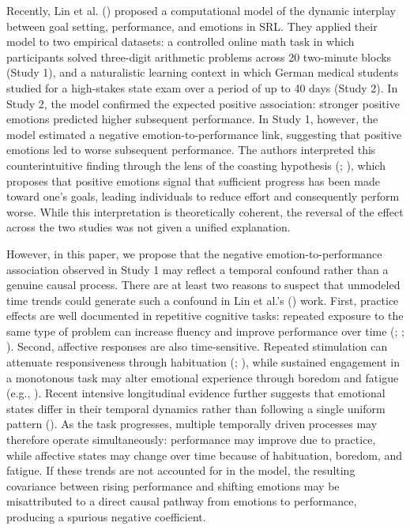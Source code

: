 \documentclass[
  man,
  floatsintext,
  longtable,
  nolmodern,
  notxfonts,
  notimes,
  colorlinks=true,linkcolor=blue,citecolor=blue,urlcolor=blue]{apa7}
\begin{document}
Recently, Lin et al. () proposed a
computational model of the dynamic interplay between goal setting,
performance, and emotions in SRL. They applied their model to two
empirical datasets: a controlled online math task in which participants
solved three-digit arithmetic problems across 20 two-minute blocks
(Study 1), and a naturalistic learning context in which German medical
students studied for a high-stakes state exam over a period of up to 40
days (Study 2). In Study 2, the model confirmed the expected positive
association: stronger positive emotions predicted higher subsequent
performance. In Study 1, however, the model estimated a negative
emotion-to-performance link, suggesting that positive emotions led to
worse subsequent performance. The authors interpreted this
counterintuitive finding through the lens of the coasting hypothesis
(;
), which proposes
that positive emotions signal that sufficient progress has been made
toward one's goals, leading individuals to reduce effort and
consequently perform worse. While this interpretation is theoretically
coherent, the reversal of the effect across the two studies was not
given a unified explanation.

However, in this paper, we propose that the negative
emotion-to-performance association observed in Study 1 may reflect a
temporal confound rather than a genuine causal process. There are at
least two reasons to suspect that unmodeled time trends could generate
such a confound in Lin et al.'s ()
work. First, practice effects are well documented in repetitive
cognitive tasks: repeated exposure to the same type of problem can
increase fluency and improve performance over time
(;
;
). Second,
affective responses are also time-sensitive. Repeated stimulation can
attenuate responsiveness through habituation
(;
), while
sustained engagement in a monotonous task may alter emotional experience
through boredom and fatigue (e.g.,
). Recent
intensive longitudinal evidence further suggests that emotional states
differ in their temporal dynamics rather than following a single uniform
pattern (). As
the task progresses, multiple temporally driven processes may therefore
operate simultaneously: performance may improve due to practice, while
affective states may change over time because of habituation, boredom,
and fatigue. If these trends are not accounted for in the model, the
resulting covariance between rising performance and shifting emotions
may be misattributed to a direct causal pathway from emotions to
performance, producing a spurious negative coefficient.
\end{document}
